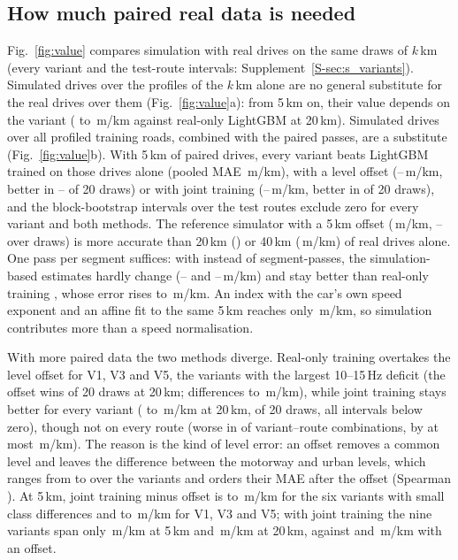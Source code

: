 \subsection{How much paired real data is needed}
\label{sec:res_value}
Fig.~\ref{fig:value} compares simulation with real drives on the same draws of $k$\,km (every variant and the test-route intervals: Supplement~\ref{S-sec:s_variants}).
Simulated drives over the profiles of the $k$\,km alone are no general substitute for the real drives over them (Fig.~\ref{fig:value}a): from 5\,km on, their value depends on the variant (\pcSameDiffTwentyMin{} to \pcSameDiffTwentyMax\,m/km against real-only LightGBM at 20\,km).
Simulated drives over all profiled training roads, combined with the paired passes, are a substitute (Fig.~\ref{fig:value}b).
With 5\,km of paired drives, every variant beats LightGBM trained on those drives alone (pooled MAE \vbRealOnlyFive\,m/km), with a level offset (\pcCalMaeFiveMin--\pcCalMaeFiveMax\,m/km, better in \pcCalWinsFiveMin--\pcCalWinsFiveMax{} of 20 draws) or with joint training (\poMaeFiveMin--\poMaeFiveMax\,m/km, better in \poWinsFiveRange{} of 20 draws), and the block-bootstrap intervals over the test routes exclude zero for every variant and both methods.
The reference simulator with a 5\,km offset (\vvVzeroCalFive\,m/km, \vvVzeroCalFiveLo--\vvVzeroCalFiveHi{} over draws) is more accurate than 20\,km (\vbRealOnlyTwenty) or 40\,km (\vbRealOnlyForty\,m/km) of real drives alone.
One pass per segment suffices: with \pdUnitsOne{} instead of \kdUnitsFive{} segment-passes, the simulation-based estimates hardly change (\pdCalOneMin--\pdCalOneMax{} and \pdPoolOneMin--\pdPoolOneMax\,m/km) and stay better than real-only training \pdOneAllDraws, whose error rises to \pdRealOne\,m/km.
An index with the car's own speed exponent and an affine fit to the same 5\,km reaches only \nsCarAffineFive\,m/km, so simulation contributes more than a speed normalisation.

With more paired data the two methods diverge.
Real-only training overtakes the level offset for V1, V3 and V5, the variants with the largest 10--15\,Hz deficit (the offset wins \pcCalHiDefWinsTwentyMax{} of 20 draws at 20\,km; differences \cuCalVoneTwenty{} to \cuCalVfiveTwenty\,m/km), while joint training stays better for every variant (\poDiffTwentyMin{} to \poDiffTwentyMax\,m/km at 20\,km, \poWinsTwentyRange{} of 20 draws, all intervals below zero), though not on every route (worse in \poRouteTwentyPos{} of \poRouteTwentyCells{} variant--route combinations, by at most \poRouteTwentyDiffMax\,m/km).
The reason is the kind of level error: an offset removes a common level and leaves the difference between the motorway and urban levels, which ranges from \ldSpreadMin{} to \ldSpreadMax{} over the variants and orders their MAE after the offset (Spearman \ldSpreadCalRho).
At 5\,km, joint training minus offset is \poLoDefDiffCalFiveMin{} to \poLoDefDiffCalFiveMax\,m/km for the six variants with small class differences and \poHiDefDiffCalFiveMin{} to \poHiDefDiffCalFiveMax\,m/km for V1, V3 and V5; with joint training the nine variants span only \poMaeSpreadFive\,m/km at 5\,km and \poMaeSpreadTwenty\,m/km at 20\,km, against \poCalSpreadFive{} and \poCalSpreadTwenty\,m/km with an offset.
